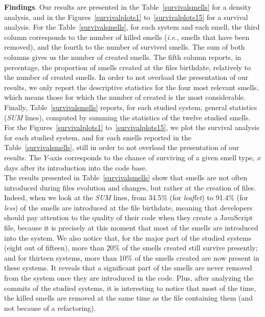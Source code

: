 \documentclass[smallcondensed]{svjour3}
\newcommand{\ie}{{\textit{i.e.,}}}
\begin{document}
\textbf{Findings}. Our results are presented in the Table~\ref{survivalsmells} for a density analysis, and in the Figures~\ref{survivalplots1} to~\ref{survivalplots15} for a survival analysis.
For the Table~\ref{survivalsmells}, for each system and each smell, the third column corresponds to the number of killed smells (\ie{} smells that have been removed), and the fourth to the number of survived smells. The sum of both columns gives us the number of created smells. The fifth column reports, in percentage, the proportion of smells created at the files birthdate, relatively to the number of created smells. In order to not overload the presentation of our results, we only report the descriptive statistics for the four most relevant smells, which means those for which the number of created is the most considerable. Finally, Table~\ref{survivalsmells} reports, for each studied system, general statistics (\textsl{SUM} lines), computed by summing the statistics of the twelve studied smells.
For the Figures~\ref{survivalplots1} to~\ref{survivalplots15}, we plot the survival analysis for each studied system, and for each smells reported in the Table~\ref{survivalsmells}, still in order to not overload the presentation of our results. The $Y$-axis corresponds to the chance of surviving of a given smell type, $x$ days after its introduction into the code base.\\
The results presented in Table~\ref{survivalsmells} show that smells are not often introduced during files evolution and changes, but rather at the creation of files. Indeed, when we look at the \textsl{SUM} lines, from 34.5\% (for \textsl{leaflet}) to 91.4\% (for \textsl{less}) of the smells are introduced at the file birthdate, meaning that developers should pay attention to the quality of their code when they create a JavaScript file, because it is precisely at this moment that most of the smells are introduced into the system. We also notice that, for the major part of the studied systems (eight out of fifteen), more than 20\% of the smells created still survive presently; and for thirteen systems, more than 10\% of the smells created are now present in these systems. It reveals that a significant part of the smells are never removed from the system once they are introduced in the code. Plus, after analyzing the commits of the studied systems, it is interesting to notice that most of the time, the killed smells are removed at the same time as the file containing them (and not because of a refactoring). \\
\end{document}

